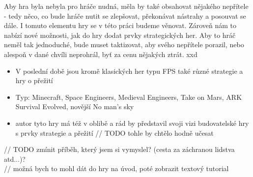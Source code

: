 Aby hra byla nebyla pro hráče nudná, měla by také obsahovat nějakého nepřítele - tedy něco, co bude hráče nutit se zlepšovat, překonávat nástrahy a posouvat se dále. I tomuto elementu hry se v této práci budeme věnovat. Zároveň nám to nabízí nové možnosti, jak do hry dodat prvky strategických her. Aby to hráč neměl tak jednoduché, bude muset taktizovat, aby svého nepřítele porazil, nebo alespoň v dané chvíli neprohrál, byť za cenu nějakých ztrát. xxd

\begin{itemize}
	\item V poslední době jsou kromě klasických her typu FPS také různé strategie a hry o přežití
	\item Typ: Minecraft, Space Engineers, Medieval Engineers, Take on Mars, ARK Survival Evolved, novější No man's sky
	\item autor tyto hry má též v oblibě a rád by představil svoji vizi budovatelské hry s prvky strategie a přežití		// TODO tohle by chtělo hodně učesat
\end{itemize}		

// TODO zmínit příběh, který jsem si vymyslel? (cesta za záchranou lidstva atd...)? \\

// možná bych to mohl dát do hry na úvod, poté zobrazit textový tutorial
